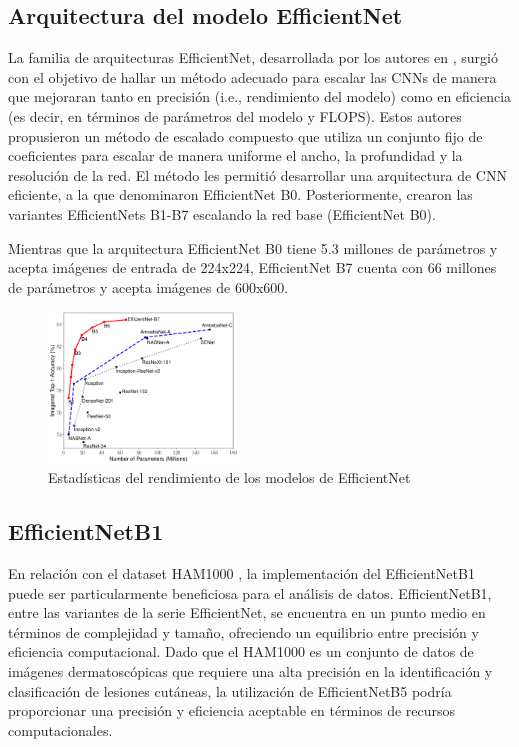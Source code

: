 \subsection{Arquitectura del modelo EfficientNet}

La familia de arquitecturas EfficientNet, desarrollada por los autores en , surgió con el objetivo de hallar un método adecuado para escalar las CNNs de manera que mejoraran tanto en precisión (i.e., rendimiento del modelo) como en eficiencia (es decir, en términos de parámetros del modelo y FLOPS). Estos autores propusieron un método de escalado compuesto que utiliza un conjunto fijo de coeficientes para escalar de manera uniforme el ancho, la profundidad y la resolución de la red. El método les permitió desarrollar una arquitectura de CNN eficiente, a la que denominaron EfficientNet B0. Posteriormente, crearon las variantes EfficientNets B1-B7 escalando la red base (EfficientNet B0).

Mientras que la arquitectura EfficientNet B0 tiene 5.3 millones de parámetros y acepta imágenes de entrada de 224x224, EfficientNet B7 cuenta con 66 millones de parámetros y acepta imágenes de 600x600. 

\begin{figure}[ht]%
   \begin{center}
   \includegraphics[width=0.45\textwidth]{./Graphics/efficientnet_performance.png}
   \caption{Estadísticas del rendimiento de los modelos de EfficientNet}
   \label{fig:efficientnet_performance}
   \end{center}
   \end{figure}

\subsection{EfficientNetB1}

En relación con el dataset HAM1000 , la implementación del EfficientNetB1 puede ser particularmente beneficiosa para el análisis de datos. EfficientNetB1, entre las variantes de la serie EfficientNet, se encuentra en un punto medio en términos de complejidad y tamaño, ofreciendo un equilibrio entre precisión y eficiencia computacional. Dado que el HAM1000 es un conjunto de datos de imágenes dermatoscópicas que requiere una alta precisión en la identificación y clasificación de lesiones cutáneas, la utilización de EfficientNetB5 podría proporcionar una precisión y eficiencia aceptable en términos de recursos computacionales.

